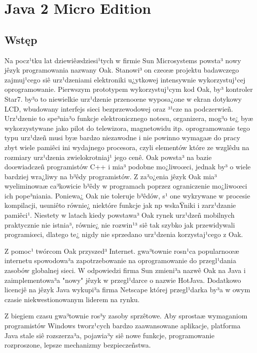 \chapter{Java 2 Micro Edition}
\label{sec:Java Micro Edition}
%
\section{Wstęp}
Na pocz¹tku lat dziewiêædziesi¹tych w firmie Sun Microsystems
powsta³ nowy jêzyk programowania nazwany Oak. Stanowi³ on czeœæ
projektu badawczego zajmuj¹cego siê urz¹dzeniami elektroniki
u¿ytkowej intensywnie wykorzystuj¹cej oprogramowanie. Pierwszym prototypem wykorzystuj¹cym kod Oak, by³ kontroler Star7. by³o to
niewielkie urz¹dzenie przenoœne wyposa¿one w ekran dotykowy LCD,
wbudowany interfejs sieci bezprzewodowej oraz ³¹cze na podczerwieñ.
Urz¹dzenie to spe³nia³o funkcje elektronicznego notesu, organizera,
mog³o te¿ byæ wykorzystywane jako pilot do telewizora, magnetowidu
itp. oprogramowanie tego typu urz¹dzeñ musi byæ bardzo niezawodne i
nie powinno wymagaæ do pracy zbyt wiele pamiêci ini wydajnego
procesora, czyli elementów które ze wzglêdu na rozmiary urz¹dzenia
zwielokrotniaj¹ jego cenê. Oak powsta³ na bazie doœwiadczeñ
programistów C++ i mia³ podobne mo¿liwoœci, jednak by³ o wiele
bardziej wra¿liwy na b³êdy programistów. Z za³o¿enia jêzyk Oak mia³
wyeliminowaæ ca³kowicie b³êdy w programach poprzez ograniczenie
mo¿liwoœci ich pope³niania. Poniewa¿ Oak nie toleruje b³êdów, s¹ one
wykrywane w procesie kompilacji, usuniêto równie¿ niektóre funkcje
jak np wskaŸniki i zarz¹dzanie pamiêci¹. Niestety w latach kiedy
powstawa³ Oak rynek urz¹dzeñ mobilnych praktycznie nie istnia³,
równie¿ nie rozwin¹³ siê tak szybko jak przewidywali programiœci,
dlatego te¿ nigdy nie sprzedano urz¹dzenia korzystaj¹cego z Oak.


 Z pomoc¹ twórcom Oak przyszed³ Internet. gwa³townie rosn¹ca
popularnoœæ internetu spowodowa³a zapotrzebowanie na oprogramowanie
do przegl¹dania zasobów globalnej sieci. W odpowiedzi firma Sun
zmieni³a nazwê Oak na Java i zaimplementowa³a "nowy" jêzyk w
przegl¹darce o nazwie HotJava. Dodatkowo licencjê na jêzyk Java
wykupi³a firma Netscape której przegl¹darka by³a w owym czasie
niekwestionowanym liderem na rynku.


Z biegiem czasu gwa³townie ros³y zasoby sprzêtowe. Aby sprostaæ
wymaganiom programistów Windows tworz¹cych bardzo zaawansowane
aplikacje, platforma Java stale siê rozszerza³a, pojawia³y siê nowe
funkcje, programowanie rozproszone, lepsze mechanizmy
bezpieczeñstwa.


